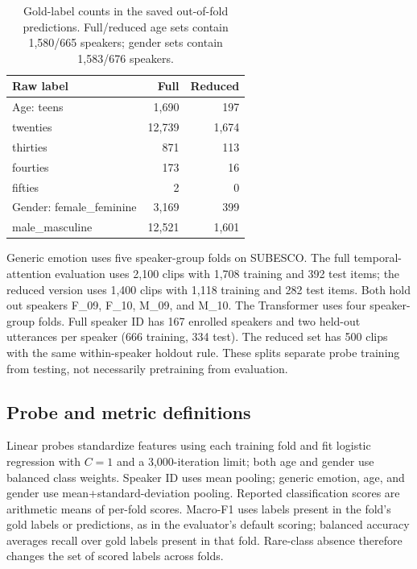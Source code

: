 \documentclass[11pt,a4paper]{article}
\begin{document}
\begin{table}[!ht]
\centering
\small
\begin{tabular}{@{}lrr@{}}
\toprule
Raw label & Full & Reduced \\
\midrule
Age: teens & 1,690 & 197 \\
twenties & 12,739 & 1,674 \\
thirties & 871 & 113 \\
fourties & 173 & 16 \\
fifties & 2 & 0 \\
\midrule
Gender: female\_feminine & 3,169 & 399 \\
male\_masculine & 12,521 & 1,601 \\
\bottomrule
\end{tabular}
\caption{Gold-label counts in the saved out-of-fold predictions. Full/reduced age sets contain 1,580/665 speakers; gender sets contain 1,583/676 speakers.}
\label{tab:demographic-labels}
\end{table}

Generic emotion uses five speaker-group folds on SUBESCO. The full temporal-attention evaluation uses 2,100 clips with 1,708 training and 392 test items; the reduced version uses 1,400 clips with 1,118 training and 282 test items. Both hold out speakers F\_09, F\_10, M\_09, and M\_10. The Transformer uses four speaker-group folds. Full speaker ID has 167 enrolled speakers and two held-out utterances per speaker (666 training, 334 test). The reduced set has 500 clips with the same within-speaker holdout rule. These splits separate probe training from testing, not necessarily pretraining from evaluation.

\subsection{Probe and metric definitions}

Linear probes standardize features using each training fold and fit logistic regression with $C=1$ and a 3,000-iteration limit; both age and gender use balanced class weights. Speaker ID uses mean pooling; generic emotion, age, and gender use mean+standard-deviation pooling. Reported classification scores are arithmetic means of per-fold scores. Macro-F1 uses labels present in the fold's gold labels or predictions, as in the evaluator's default scoring; balanced accuracy averages recall over gold labels present in that fold. Rare-class absence therefore changes the set of scored labels across folds.
\end{document}
